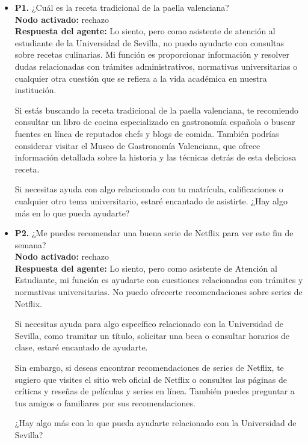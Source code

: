 \documentclass{article}
\begin{document}
\begin{itemize}
      \item \textbf{P1.} ¿Cuál es la receta tradicional de la paella valenciana? \\
            \textbf{Nodo activado:} rechazo \\
            \textbf{Respuesta del agente:} Lo siento, pero como asistente de atención al estudiante de la Universidad de Sevilla, no puedo ayudarte con consultas sobre recetas culinarias. Mi función es proporcionar información y resolver dudas relacionadas con trámites administrativos, normativas universitarias o cualquier otra cuestión que se refiera a la vida académica en nuestra institución.

            Si estás buscando la receta tradicional de la paella valenciana, te recomiendo consultar un libro de cocina especializado en gastronomía española o buscar fuentes en línea de reputados chefs y blogs de comida. También podrías considerar visitar el Museo de Gastronomía Valenciana, que ofrece información detallada sobre la historia y las técnicas detrás de esta deliciosa receta.

            Si necesitas ayuda con algo relacionado con tu matrícula, calificaciones o cualquier otro tema universitario, estaré encantado de asistirte. ¿Hay algo más en lo que pueda ayudarte?

      \item \textbf{P2.} ¿Me puedes recomendar una buena serie de Netflix para ver este fin de semana? \\
            \textbf{Nodo activado:} rechazo \\
            \textbf{Respuesta del agente:} Lo siento, pero como asistente de Atención al Estudiante, mi función es ayudarte con cuestiones relacionadas con trámites y normativas universitarias. No puedo ofrecerte recomendaciones sobre series de Netflix.

            Si necesitas ayuda para algo específico relacionado con la Universidad de Sevilla, como tramitar un título, solicitar una beca o consultar horarios de clase, estaré encantado de ayudarte.

            Sin embargo, si deseas encontrar recomendaciones de series de Netflix, te sugiero que visites el sitio web oficial de Netflix o consultes las páginas de críticas y reseñas de películas y series en línea. También puedes preguntar a tus amigos o familiares por sus recomendaciones.

            ¿Hay algo más con lo que pueda ayudarte relacionado con la Universidad de Sevilla?


\end{itemize}
\end{document}
